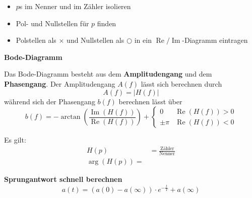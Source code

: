 \documentclass[12pt, a4paper]{scrartcl}
\begin{document}
\begin{itemize}
\item \(p\)s im Nenner und im Zähler isolieren
\item Pol- und Nullstellen für \(p\) finden
\item Polstellen als \(\times\) und Nullstellen als \(\bigcirc\) in ein \(\operatorname{Re} / \operatorname{Im}\)-Diagramm eintragen
\end{itemize}

\textbf{Bode-Diagramm}

Das Bode-Diagramm besteht aus dem \textbf{Amplitudengang} und dem \textbf{Phasengang}. Der Amplitudengang \(A(f)\) lässt sich berechnen durch
\[A(f) = |H(f)|\]
während sich der Phasengang \(b(f)\) berechnen lässt über
\[b(f) = -\arctan\left(\frac{\operatorname{Im}(H(f))}{\operatorname{Re}(H(f))}\right) +
  \begin{cases}
    0 & \operatorname{Re}(H(f)) > 0\\
    \pm \pi & \operatorname{Re}(H(f)) < 0
  \end{cases}
\]

 Es gilt:
\begin{align*}
  H(p) &= \frac{\textrm{Zähler}}{\textrm{Nenner}}\\
  \operatorname{arg}(H(p)) = 
\end{align*}

\textbf{Sprungantwort schnell berechnen}
\[a(t) = (a(0) - a(\infty)) \cdot e^{-\frac{t}{T}} + a(\infty)\]
\end{document}
